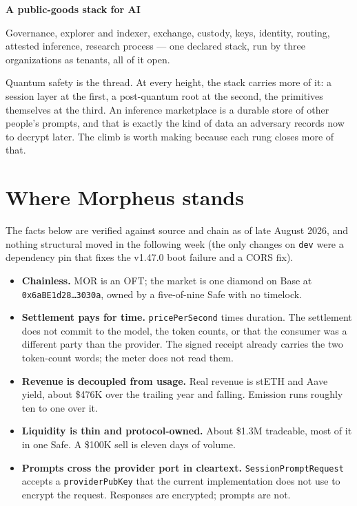 \documentclass[11pt,a4paper]{article}
\newcommand{\code}[1]{\texttt{\small #1}}
\newcommand{\lift}[1]{{\color{muted}\footnotesize\sffamily #1}}
\newcommand{\height}[2]{\vspace{0.9ex}\noindent\textbf{#1}\quad\lift{#2}\par\nopagebreak\vspace{0.2ex}}
\begin{document}
\height{A public-goods stack for AI}{the whole estate}
Governance, explorer and indexer, exchange, custody, keys, identity, routing, attested inference,
research process --- one declared stack, run by three organizations as tenants, all of it open.

\vspace{0.6ex}
\noindent Quantum safety is the thread. At every height, the stack carries more of it: a session layer at
the first, a post-quantum root at the second, the primitives themselves at the third. An inference
marketplace is a durable store of other people's prompts, and that is exactly the kind of data an
adversary records now to decrypt later. The climb is worth making because each rung closes more of that.

\section{Where Morpheus stands}

The facts below are verified against source and chain as of late August 2026, and nothing structural
moved in the following week (the only changes on \code{dev} were a dependency pin that fixes the
v1.47.0 boot failure and a CORS fix).

\begin{itemize}
\item \textbf{Chainless.} MOR is an OFT; the market is one diamond on Base at
      \code{0x6aBE1d28\ldots3030a}, owned by a five-of-nine Safe with no timelock.
\item \textbf{Settlement pays for time.} \code{pricePerSecond} times duration. The settlement does not
      commit to the model, the token counts, or that the consumer was a different party than the provider.
      The signed receipt already carries the two token-count words; the meter does not read them.
\item \textbf{Revenue is decoupled from usage.} Real revenue is stETH and Aave yield, about \$476K over the
      trailing year and falling. Emission runs roughly ten to one over it.
\item \textbf{Liquidity is thin and protocol-owned.} About \$1.3M tradeable, most of it in one Safe. A
      \$100K sell is eleven days of volume.
\item \textbf{Prompts cross the provider port in cleartext.} \code{SessionPromptRequest} accepts a
      \code{providerPubKey} that the current implementation does not use to encrypt the request. Responses
      are encrypted; prompts are not.
\end{itemize}
\end{document}

